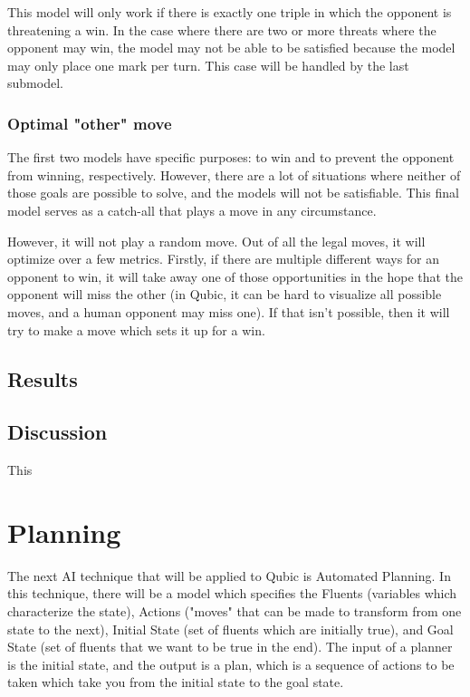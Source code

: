 \documentclass[11pt]{article}
\begin{document}
This model will only work if there is exactly one triple in which the opponent is threatening a win. In the case where there are two or more threats where the opponent may win, the model may not be able to be satisfied because the model may only place one mark per turn. This case will be handled by the last submodel.

\subsubsection{Optimal "other" move}
The first two models have specific purposes: to win and to prevent the opponent from winning, respectively. However, there are a lot of situations where neither of those goals are possible to solve, and the models will not be satisfiable. This final model serves as a catch-all that plays a move in any circumstance.

However, it will not play a random move. Out of all the legal moves, it will optimize over a few metrics. Firstly, if there are multiple different ways for an opponent to win, it will take away one of those opportunities in the hope that the opponent will miss the other (in Qubic, it can be hard to visualize all possible moves, and a human opponent may miss one). If that isn't possible, then it will try to make a move which sets it up for a win.


\subsection{Results}


\subsection{Discussion}
This

\section{Planning}
The next AI technique that will be applied to Qubic is Automated Planning. In this technique, there will be a model which specifies the Fluents (variables which characterize the state), Actions ("moves" that can be made to transform from one state to the next), Initial State (set of fluents which are initially true), and Goal State (set of fluents that we want to be true in the end). The input of a planner is the initial state, and the output is a plan, which is a sequence of actions to be taken which take you from the initial state to the goal state.
\end{document}
